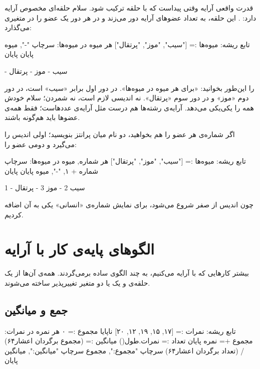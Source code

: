 قدرت واقعی آرایه وقتی پیداست که با حلقه ترکیب شود. سلام حلقه‌ای مخصوص
آرایه دارد: . این حلقه، به تعداد عضوهای آرایه دور می‌زند و در هر
دور یک عضو را در متغیری می‌گذارد:

\begin{salamfa}
تابع ریشه:
    میوه‌ها := ["سیب", "موز", "پرتقال"]
    هر میوه در میوه‌ها:
        سرچاپ "-", میوه
    پایان
پایان
\end{salamfa}

\begin{outputfa}
- سیب
- موز
- پرتقال
\end{outputfa}

 را این‌طور بخوانید: «برای هر میوه در میوه‌ها».
در دور اول  برابر «سیب» است، در دور دوم «موز» و در دور سوم
«پرتقال». نه اندیسی لازم است، نه شمردن؛ سلام خودش همه را یکی‌یکی می‌دهد.
آرایه‌ی رشته‌ها هم درست مثل آرایه‌ی عددهاست؛ فقط همه‌ی عضوها باید هم‌گونه
باشند.

اگر شماره‌ی هر عضو را هم بخواهید، دو نام میان پرانتز بنویسید؛ اولی اندیس
را می‌گیرد و دومی عضو را:

\begin{salamfa}
تابع ریشه:
    میوه‌ها := ["سیب", "موز", "پرتقال"]
    هر شماره, میوه در میوه‌ها:
        سرچاپ شماره + ۱, "-", میوه
    پایان
پایان
\end{salamfa}

\begin{outputfa}
1 - سیب
2 - موز
3 - پرتقال
\end{outputfa}

چون اندیس از صفر شروع می‌شود، برای نمایش شماره‌ی «انسانی» یکی به آن
اضافه کردیم.

\section{الگوهای پایه‌ی کار با آرایه}

بیشتر کارهایی که با آرایه می‌کنیم، به چند الگوی ساده برمی‌گردند. همه‌ی
آن‌ها از یک حلقه‌ی  و یک یا دو متغیر تغییرپذیر ساخته می‌شوند.

\subsection{جمع و میانگین}

\begin{salamfa}
تابع ریشه:
    نمرات := [۱۷, ۱۵, ۱۹, ۱۲, ۲۰]
    ناپایا مجموع := ۰
    هر نمره در نمرات:
        مجموع += نمره
    پایان
    تعداد := نمرات.طول()
    میانگین := (مجموع برگردان اعشار۶۴) / (تعداد برگردان اعشار۶۴)
    سرچاپ "مجموع:", مجموع
    سرچاپ "میانگین:", میانگین
پایان
\end{salamfa}

